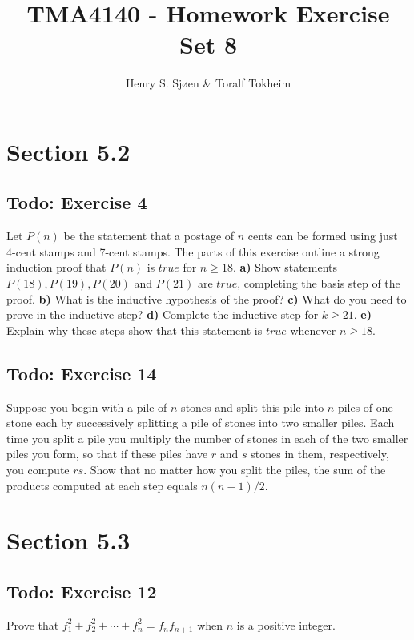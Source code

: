 \documentclass[12pt]{article}
\author{Henry S. Sjøen \& Toralf Tokheim}
\title{
  \textbf{TMA4140 - Homework Exercise Set 8}}
\begin{document}
    \maketitle
    \thispagestyle{empty}
    \pagebreak
    \tableofcontents
    \pagebreak

    \section{Section 5.2}
    \subsection{Todo: Exercise 4}
    Let $P(n)$ be the statement that a postage of $n$ cents can be formed using just 4-cent stamps and 7-cent stamps. The parts of this exercise outline a strong induction proof that $P(n)$ is $true$ for $n\geq 18$.
    \textbf{a)} Show statements $P(18),P(19),P(20)$ and $P(21)$ are $true$, completing the basis step of the proof.
    \textbf{b)} What is the inductive hypothesis of the proof?
    \textbf{c)} What do you need to prove in the inductive step?
    \textbf{d)} Complete the inductive step for $k \geq 21$.
    \textbf{e)} Explain why these steps show that this statement is $true$ whenever $n\geq 18$.

    \subsection{Todo: Exercise 14}
    Suppose you begin with a pile of $n$ stones and split this pile into $n$ piles of one stone each by successively splitting a pile of stones into two smaller piles. Each time you split a pile you multiply the number of stones in each of the two smaller piles you form, so that if these piles have $r$ and $s$ stones in them, respectively, you compute $rs$. Show that no matter how you split the piles, the sum of the products computed at each step equals $n(n-1)/2$.

    \section{Section 5.3}
    \subsection{Todo: Exercise 12}
    Prove that $f_1^2 +f_2^2 +\cdots+f_n^2 =f_nf_{n+1}$ when $n$ is a positive integer.
\end{document}
